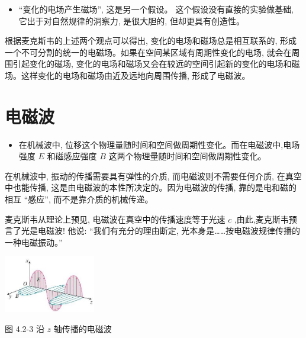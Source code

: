 \documentclass[10pt]{article}
\begin{document}
\begin{mdframed}

\begin{itemize}
\item “变化的电场产生磁场”, 这是另一个假设。 这个假设没有直接的实验做基础, 它出于对自然规律的洞察力, 是很大胆的, 但却更具有创造性。
\end{itemize}

\end{mdframed}

根据麦克斯韦的上述两个观点可以得出, 变化的电场和磁场总是相互联系的, 形成一个不可分割的统一的电磁场。如果在空间某区域有周期性变化的电场, 就会在周围引起变化的磁场, 变化的电场和磁场又会在较远的空间引起新的变化的电场和磁场。这样变化的电场和磁场由近及远地向周围传播, 形成了电磁波。

\section*{电磁波}

\begin{mdframed}

\begin{itemize}
\item 在机械波中, 位移这个物理量随时间和空间做周期性变化。而在电磁波中,电场强度 \(E\) 和磁感应强度 \(B\) 这两个物理量随时间和空间做周期性变化。
\end{itemize}

\end{mdframed}

在机械波中, 振动的传播需要具有弹性的介质, 而电磁波则不需要任何介质, 在真空中也能传播, 这是由电磁波的本性所决定的。因为电磁波的传播, 靠的是电和磁的相互 “感应”, 而不是靠介质的机械传递。

麦克斯韦从理论上预见, 电磁波在真空中的传播速度等于光速 \(c\) ,由此,麦克斯韦预言了光是电磁波! 他说: “我们有充分的理由断定, 光本身是……按电磁波规律传播的一种电磁振动。”

\begin{center}
\includegraphics[max width=0.3\textwidth]{images/01910e72-c5b7-7ed5-a6d4-fb3a5faefc32_82_630584.jpg}
\end{center}

图 4.2-3 沿 \(z\) 轴传播的电磁波
\end{document}
